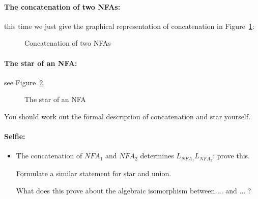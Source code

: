 \paragraph{The concatenation of two NFAs:} this time we just give the
graphical representation of concatenation in Figure~\ref{concatfsa}:

\begin{figure}[h]
\caption{Concatenation of two NFAs\label{concatfsa}}
\end{figure}


\clearpage
\paragraph{The star of an NFA:} see Figure~\ref{starfsa}.

\begin{figure}[h]
\caption{The star of an NFA\label{starfsa}}
\end{figure}


You should work out the formal description of concatenation and star
yourself.

\paragraph{Selfie:}
\begin{itemize}
\item[]
The concatenation of $NFA_1$ and $NFA_2$ determines
$L_{NFA_1}L_{NFA_2}$: prove this.

Formulate a similar statement for star and union.

What does this prove about the algebraic isomorphism between ... and ... ?

\end{itemize}

